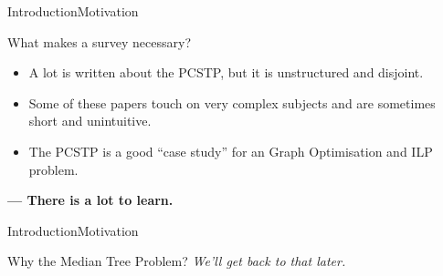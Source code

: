 \documentclass[rgb,dvipsnames]{beamer}
\begin{document}


\begin{frame}{Introduction}{Motivation}
  \begin{block}{What makes a survey necessary?}
  \pause
  \begin{itemize}[<+->]
  \item A lot is written about the PCSTP, but it is unstructured and disjoint.
  \item Some of these papers touch on very complex subjects
    and are sometimes short and unintuitive.
  \item The PCSTP is a good ``case study'' for an Graph Optimisation and ILP problem.
  \end{itemize}
  \pause
  \textbf{ --- There is a lot to learn.}
\end{block}
\end{frame}

\begin{frame}{Introduction}{Motivation}
  \begin{block}{Why the Median Tree Problem?}
  \pause
  \textit{We'll get back to that later.}
\end{block}

\end{frame}
\end{document}
